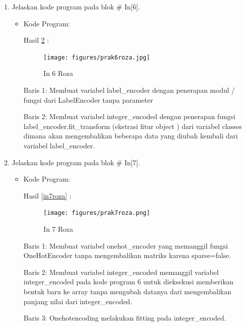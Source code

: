 \begin{enumerate}
\item Jelaskan kode program pada blok \# In[6].
\begin{itemize}
\item Kode Program:

\par Hasil \ref{in6roza} :
\begin{figure}[!hbtp]
\centering
\texttt{[image: figures/prak6roza.jpg]}
\caption{In 6 Roza}
\label{in6roza}
\end{figure}
\par Baris 1: Membuat variabel label\_encoder dengan penerapan modul / fungsi dari LabelEncoder tanpa parameter
\par Baris 2: Membuat variabel integer\_encoded dengan penerapan fungsi label\_encoder.fit\_transform (ekstrasi fitur object ) dari variabel classes dimana akan mengembalikan beberapa data yang diubah kembali dari variabel label\_encoder.
\end{itemize}
\par

\item Jelaskan kode program pada blok \# In[7].
\begin{itemize}
\item Kode Program:

\par Hasil \ref{in7roza} :
\begin{figure}[!hbtp]
\centering
\texttt{[image: figures/prak7roza.png]}
\caption{In 7 Roza}
\label{in6roza}
\end{figure}
\par Baris 1: Membuat variabel onehot\_encoder yang memanggil fungsi OneHotEncoder tanpa mengembalikan matriks karena sparse=false.
\par Baris 2: Membuat variabel integer\_encoded memanggil variabel integer\_encoded pada kode program 6 untuk dieksekusi memberikan bentuk baru ke array tanpa mengubah datanya dari mengembalikan panjang nilai dari integer\_encoded.
\par Baris 3: Onehotencoding melakukan fitting pada integer\_encoded.
\end{itemize}
\par


\end{enumerate}
